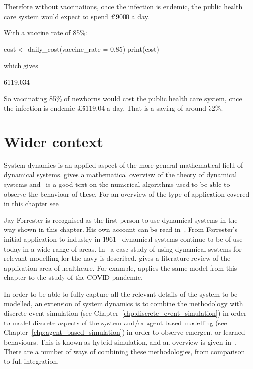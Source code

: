 Therefore without vaccinations, once the infection is endemic, the public health
care system would expect to spend $\pounds 9000$ a day.

With a vaccine rate of 85\%:

\begin{Rin}
cost <- daily_cost(vaccine_rate = 0.85)
print(cost)
\end{Rin}

which gives

\begin{Rout}
[1] 6119.034
\end{Rout}

So vaccinating 85\% of newborns would cost the public health care system, once
the infection is endemic $\pounds 6119.04$ a day. That is a saving of around
32\%.

\section{Wider context}\label{sec:system_dynamics_wider_context}

System dynamics is an applied aspect of the more general mathematical field of
dynamical systems. \parencite{robinson1998dynamical} gives a mathematical
overview of the theory of dynamical systems and~\parencite{burden2001numerical}
is a good text on the numerical algorithms used to be able to observe the
behaviour of these. For an overview of the type of
application covered in this chapter see~\parencite{martin2006theory}.

Jay Forrester is recognised as the first person to use dynamical systems in the way
shown in this chapter. His own account can be read
in~\parencite{forrester1995beginning}. From Forrester's initial application to
industry in 1961~\parencite{forrester1961industrial} dynamical systems continue
to be of use today in a wide range of areas. In~\parencite{coyle1999system}
a case study of using dynamical systems for relevant modelling for the navy is
described.
\parencite{vazquez2020system} gives a literature review of the application area
of healthcare. For example, \parencite{cooper2020sir} applies the same model
from this chapter to the study of the COVID pandemic.

In order to be able to fully capture all the relevant details of the system to be
modelled, an extension of system dynamics is to combine the methodology
with discrete event simulation (see Chapter~\ref{chp:discrete_event_simulation})
in order to model discrete aspects of the system
and/or agent based modelling (see Chapter~\ref{chp:agent_based_simulation}) in
order to observe emergent or learned
behaviours. This is known as hybrid simulation, and an overview is given
in~\parencite{brailsford2019hybrid}. There are a number of ways of
combining these methodologies, from comparison to full integration.
